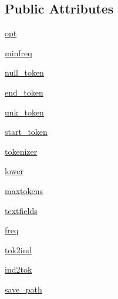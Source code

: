 \subsection*{Public Attributes}
\begin{DoxyCompactItemize}
\item 
\hyperlink{classwizard__transformer__ranker_1_1wizard__dict_1_1WizardDictAgent_a923546de802c8a2afd98f613c2c6d3a1}{opt}
\item 
\hyperlink{classwizard__transformer__ranker_1_1wizard__dict_1_1WizardDictAgent_a5df8b8f623f5ba837551ffe1ef3e65c1}{minfreq}
\item 
\hyperlink{classwizard__transformer__ranker_1_1wizard__dict_1_1WizardDictAgent_ab5afc904323b745c7d7116c1b070fa1b}{null\+\_\+token}
\item 
\hyperlink{classwizard__transformer__ranker_1_1wizard__dict_1_1WizardDictAgent_a6b567b120fddd84336bbdb4804841549}{end\+\_\+token}
\item 
\hyperlink{classwizard__transformer__ranker_1_1wizard__dict_1_1WizardDictAgent_affda964efc02d09b21e3c630b7f9609f}{unk\+\_\+token}
\item 
\hyperlink{classwizard__transformer__ranker_1_1wizard__dict_1_1WizardDictAgent_a25fa358a5f7ff470c5506bcf82209e5b}{start\+\_\+token}
\item 
\hyperlink{classwizard__transformer__ranker_1_1wizard__dict_1_1WizardDictAgent_a5fe260a03b646af55b200bfda965bd75}{tokenizer}
\item 
\hyperlink{classwizard__transformer__ranker_1_1wizard__dict_1_1WizardDictAgent_add07cebca3636ed702d9d6ac865e0e59}{lower}
\item 
\hyperlink{classwizard__transformer__ranker_1_1wizard__dict_1_1WizardDictAgent_aed8c92940674934dd0a39962bbd9f685}{maxtokens}
\item 
\hyperlink{classwizard__transformer__ranker_1_1wizard__dict_1_1WizardDictAgent_a6294c413227f7ca77ce49d486287dbd9}{textfields}
\item 
\hyperlink{classwizard__transformer__ranker_1_1wizard__dict_1_1WizardDictAgent_ab1838a57188cffbaec52e32f1fced6f6}{freq}
\item 
\hyperlink{classwizard__transformer__ranker_1_1wizard__dict_1_1WizardDictAgent_ab6b0d7cd72a040e90a181808fe53dd33}{tok2ind}
\item 
\hyperlink{classwizard__transformer__ranker_1_1wizard__dict_1_1WizardDictAgent_a9d6edacfa1b60b59a273993d4ea52e32}{ind2tok}
\item 
\hyperlink{classwizard__transformer__ranker_1_1wizard__dict_1_1WizardDictAgent_a9551b8a14c9602fc6b58f3ddb6a93dbe}{save\+\_\+path}
\end{DoxyCompactItemize}
